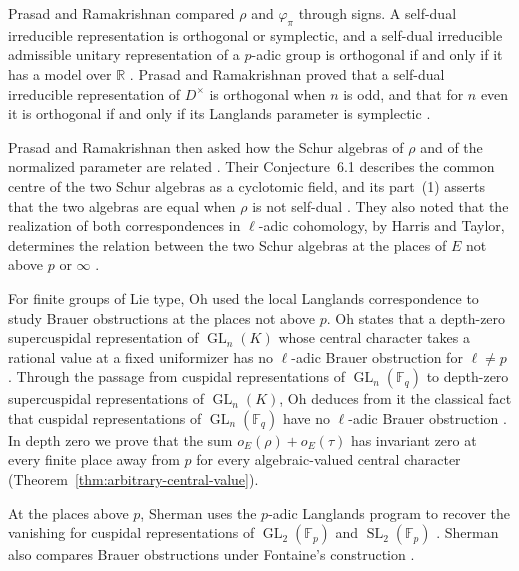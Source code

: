 \documentclass[a4paper,11pt]{amsart}
\theoremstyle{definition}
\theoremstyle{remark}
\numberwithin{equation}{section}
\DeclareMathOperator{\GL}{GL}
\newcommand{\F}{\mathbb{F}}
\newcommand{\R}{\mathbb{R}}
\DeclareMathOperator{\SL}{SL}
\begin{document}
Prasad and Ramakrishnan compared $\rho$ and $\varphi_\pi$ through signs. A self-dual irreducible representation is orthogonal or symplectic, and a self-dual irreducible admissible unitary representation of a $p$-adic group is orthogonal if and only if it has a model over $\R$ \cite[Lemma~2.1]{PR12}. Prasad and Ramakrishnan proved that a self-dual irreducible representation of $D^\times$ is orthogonal when $n$ is odd, and that for $n$ even it is orthogonal if and only if its Langlands parameter is symplectic \cite[Theorem~A and Corollary~B]{PR12}.

Prasad and Ramakrishnan then asked how the Schur algebras of $\rho$ and of the normalized parameter are related \cite[Question~6.1]{PR12}. Their Conjecture~6.1 describes the common centre of the two Schur algebras as a cyclotomic field, and its part~(1) asserts that the two algebras are equal when $\rho$ is not self-dual \cite[Conjecture~6.1(1)]{PR12}. They also noted that the realization of both correspondences in $\ell$-adic cohomology, by Harris and Taylor, determines the relation between the two Schur algebras at the places of $E$ not above $p$ or $\infty$ \cite[\S6]{PR12}.

For finite groups of Lie type, Oh used the local Langlands correspondence to study Brauer obstructions at the places not above $p$. Oh states that a depth-zero supercuspidal representation of $\GL_n(K)$ whose central character takes a rational value at a fixed uniformizer has no $\ell$-adic Brauer obstruction for $\ell\ne p$ \cite[Theorem~7]{Oh16}. Through the passage from cuspidal representations of $\GL_n(\F_q)$ to depth-zero supercuspidal representations of $\GL_n(K)$, Oh deduces from it the classical fact that cuspidal representations of $\GL_n(\F_q)$ have no $\ell$-adic Brauer obstruction \cite[Theorem~8]{Oh16}. In depth zero we prove that the sum $o_E(\rho)+o_E(\tau)$ has invariant zero at every finite place away from $p$ for every algebraic-valued central character (Theorem~\ref{thm:arbitrary-central-value}).

At the places above $p$, Sherman uses the $p$-adic Langlands program to recover the vanishing for cuspidal representations of $\GL_2(\F_p)$ and $\SL_2(\F_p)$ \cite[Theorem~1.1.1]{She18}. Sherman also compares Brauer obstructions under Fontaine's construction \cite[Lemma~4.2.5]{She18}.
\end{document}
